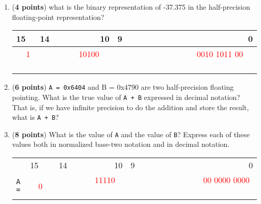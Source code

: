 \documentclass[psfig,11pt]{article}
\newcommand{\sol}[1]{\noindent\textcolor{red}{{#1}}}
\newif\ifsol
\begin{document}
\begin{question}[30]
\begin{enumerate}
\item ({\bf 4 points}) what is the binary representation of -37.375 in the half-precision floating-point representation?



\begin{table}[!h]\centering
\begin{tabular}{|c|lcr|lcr|}
\multicolumn{1}{l}{15} &
\multicolumn{1}{l}{14} &  & \multicolumn{1}{r}{10} & 
\multicolumn{1}{l}{9} &  & \multicolumn{1}{r}{0} \\ \hline
\multicolumn{1}{|c|}{\ \ \sol{1} \ \ } &
\multicolumn{3}{|c|}{\ \ \ \ \ \ \ \sol{10100} \ \ \ \ \ \ \ \ \ \ \ \ \ }  &
\multicolumn{3}{|c|}{\ \ \ \ \ \ \ \ \ \ \ \ \ \ \ \ \ \sol{0010 1011 00} \ \ \ \ \ \ \ \ \ \ \ \ \ \ \ \ \ \ \ \ \ \ \ \ }  \\ \hline
\end{tabular}
\end{table}
\color{black}


\ifsol
\color{red}
\vspace{.2in}
$-37.375_{10} =  -100101.011_2 = 1.00101011 \times 2^5$ \\
$\mathit{biasedexponent} - 15 = 5 \Rightarrow \mathit{biasedexponent} = 20 = 01010_2$\\
$\mathit{sign} = 1$ \\
$\mathit{fraction} = 0010101100$ \\


 \color{black}
 \else
 \vspace{.1in}
 \fi
 
 
\item ({\bf 6 points})  {\tt A = 0x6404} and {B = 0x4790} are two half-precision floating pointing. What is the true value of {\tt A + B}  expressed in decimal notation? That is, if we have infinite precision to do the addition and store the result, what is {\tt A + B}?

\item ({\bf 8 points}) What is the value of {\tt A} and the value of {\tt B}? Express each of these values both in normalized base-two notation and in decimal notation.

\begin{table}[!h]\centering
\begin{tabular}{l|c|lcr|lcr|}
\multicolumn{1}{l}{}& \multicolumn{1}{l}{15} &
\multicolumn{1}{l}{14} &  & \multicolumn{1}{r}{10} & 
\multicolumn{1}{l}{9} &  & \multicolumn{1}{r}{0} \\ \cline{2-8}
{\tt A =} & \multicolumn{1}{|c|}{\ \ \sol{0}\ \ } &
\multicolumn{3}{|c|}{\ \ \ \ \ \ \ \sol{11110} \ \ \ \ \ \ \ \ \ \ \ \ \ }  &
\multicolumn{3}{|c|}{\ \ \ \ \ \ \ \ \ \ \ \ \ \ \ \ \ \sol{00 0000 0000} \ \ \ \ \ \ \ \ \ \ \ \ \ \ \ \ \ \ \ \ \ \ \ \ }  \\ \cline{2-8}
\end{tabular}
\end{table}


\end{enumerate}
\end{question}
\end{document}
